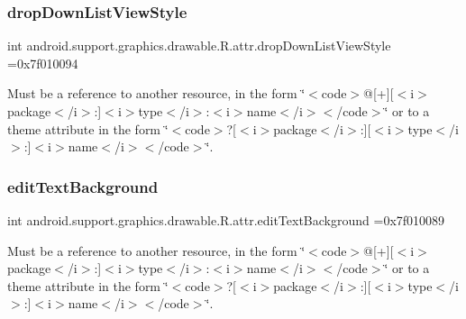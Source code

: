 \subsubsection{\texorpdfstring{drop\+Down\+List\+View\+Style}{dropDownListViewStyle}}
{\footnotesize\ttfamily int android.\+support.\+graphics.\+drawable.\+R.\+attr.\+drop\+Down\+List\+View\+Style =0x7f010094\hspace{0.3cm}{\ttfamily [static]}}

Must be a reference to another resource, in the form \char`\"{}$<$code$>$@\mbox{[}+\mbox{]}\mbox{[}$<$i$>$package$<$/i$>$\+:\mbox{]}$<$i$>$type$<$/i$>$\+:$<$i$>$name$<$/i$>$$<$/code$>$\char`\"{} or to a theme attribute in the form \char`\"{}$<$code$>$?\mbox{[}$<$i$>$package$<$/i$>$\+:\mbox{]}\mbox{[}$<$i$>$type$<$/i$>$\+:\mbox{]}$<$i$>$name$<$/i$>$$<$/code$>$\char`\"{}. \mbox{\label{classandroid_1_1support_1_1graphics_1_1drawable_1_1R_1_1attr_a3a2601ac42c85cb1711c6daec302bc75}} 
\subsubsection{\texorpdfstring{edit\+Text\+Background}{editTextBackground}}
{\footnotesize\ttfamily int android.\+support.\+graphics.\+drawable.\+R.\+attr.\+edit\+Text\+Background =0x7f010089\hspace{0.3cm}{\ttfamily [static]}}

Must be a reference to another resource, in the form \char`\"{}$<$code$>$@\mbox{[}+\mbox{]}\mbox{[}$<$i$>$package$<$/i$>$\+:\mbox{]}$<$i$>$type$<$/i$>$\+:$<$i$>$name$<$/i$>$$<$/code$>$\char`\"{} or to a theme attribute in the form \char`\"{}$<$code$>$?\mbox{[}$<$i$>$package$<$/i$>$\+:\mbox{]}\mbox{[}$<$i$>$type$<$/i$>$\+:\mbox{]}$<$i$>$name$<$/i$>$$<$/code$>$\char`\"{}. \mbox{\label{classandroid_1_1support_1_1graphics_1_1drawable_1_1R_1_1attr_a7d48ea984660f7534e1b0b5cf1f0993f}} 
